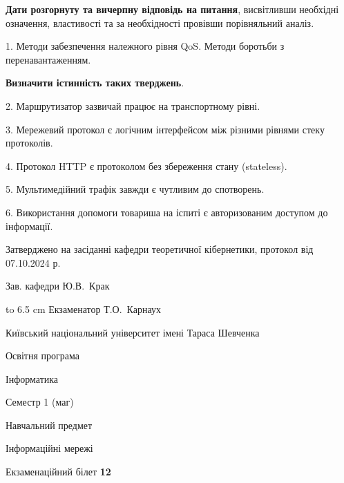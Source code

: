 \documentclass[12pt, ukrainian]{article}
\begin{document}
{
\qquad\textbf{Дати розгорнуту та вичерпну відповідь на питання}, висвітливши необхідні означення, властивості та за необхідності провівши порівняльний аналіз.

1. Методи забезпечення належного рівня QoS. Методи боротьби з перенавантаженням.



\qquad\textbf{Визначити істинність таких тверджень}.

2. Маршрутизатор зазвичай працює на транспортному рівні.


3. Мережевий протокол є логічним інтерфейсом між різними рівнями стеку протоколів.


4. Протокол  HTTP є протоколом без збереження стану (stateless).


5. Мультимедійний трафік завжди є чутливим до спотворень.


6. Використання допомоги товариша на іспиті є авторизованим доступом до інформації.

}
{\smallskip\smallskip \begin {scriptsize} Затверджено на засіданні кафедри теоретичної кібернетики, протокол   від   07.10.2024 р.\par\smallskip\smallskip\smallskip\smallskip
{\parbox {6.5 cm} {Зав. кафедри \dotfill Ю.В.~Крак}}\hspace {0.7cm} {\hbox to 6.5 cm { Екзаменатор \dotfill Т.О.~Карнаух}} \end{scriptsize}}
\vspace{0.9cm}
{{\begin {scriptsize}\par
{ \center  Київський національний університет імені Тараса Шевченка \par}
{\parbox {5 cm}{Освітня програма \hfill}{\parbox {7 cm}{Інформатика\hfill}}\parbox {6 cm}{\hfill Семестр 1 (маг)}}\par
{\parbox {5 cm} {Навчальний предмет \hfill}\parbox {7 cm}{Інформаційні мережі \hfill}\parbox {6cm}{\hfill}\par}\vspace{-15pt} \end{scriptsize}}{\center Екзаменаційний білет \No \textbf { 12 }\par}}
\end{document}
